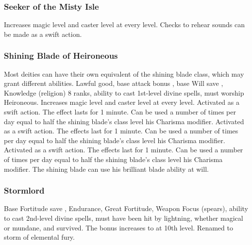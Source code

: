 \subsubsection{Seeker of the Misty Isle}
 Increases magic level and caster level at every level.
 Checks to rehear sounds can be made as a swift action.
\subsubsection{Shining Blade of Heironeous}
 Most deities can have their own equivalent of the shining blade class, which may grant different abilities.
 Lawful good, base attack bonus , base Will save , Knowledge (religion) 8 ranks, ability to cast 1st-level divine spells, must worship Heironeous.
 Increases magic level and caster level at every level.
 Activated as a swift action. The effect lasts for 1 minute. Can be used a number of times per day equal to half the shining blade's class level \add his Charisma modifier.
 Activated as a swift action. The effects last for 1 minute. Can be used a number of times per day equal to half the shining blade's class level \add his Charisma modifier.
 Activated as a swift action. The effects last for 1 minute. Can be used a number of times per day equal to half the shining blade's class level \add his Charisma modifier.
 The shining blade can use his brilliant blade ability at will.
\subsubsection{Stormlord}
 Base Fortitude save , Endurance, Great Fortitude, Weapon Focus (spears), ability to cast 2nd-level divine spells, must have been hit by lightning, whether magical or mundane, and survived.
 The bonus increases to  at 10th level.
 Renamed to storm of elemental fury.
